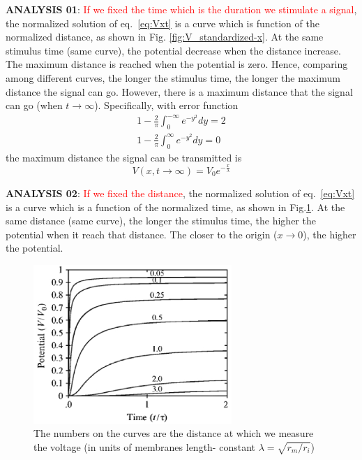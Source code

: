 {\bf ANALYSIS 01}: \textcolor{red}{If we fixed the time which is the duration we
stimulate a signal}, the normalized solution of eq.~\eqref{eq:Vxt} is a curve
which is function of the normalized distance, as shown in
Fig. \ref{fig:V_standardized-x}. At the same stimulus time (same
curve), the potential decrease when the distance increase. The maximum
distance is reached when the potential is zero. Hence, comparing among
different curves, the longer the stimulus time, the longer the maximum
distance the signal can go. However, there is a maximum distance that
the signal can go (when $t\rightarrow \infty$).  Specifically, with
error function
\begin{equation}\begin{split}
  1 -
  \frac{2}{\pi}
  \int_0^{-\infty} e^{-y^2} dy = 2 \\
  1 -
  \frac{2}{\pi}
  \int_0^{\infty} e^{-y^2} dy = 0
\end{split}
\end{equation}
the maximum distance the signal can be transmitted is 
\begin{equation}
  V(x,t\rightarrow \infty) = V_0 e^{-\frac{x}{\lambda}}
\end{equation}

{\bf ANALYSIS 02}: \textcolor{red}{If we fixed the distance}, the normalized
solution of eq.~\eqref{eq:Vxt} is a curve which is a function of the normalized
time, as shown in Fig.\ref{fig:V_standardized-t}. At the same distance
(same curve), the longer the stimulus time, the higher the potential
when it reach that distance. The closer to the origin ($x\rightarrow
0$), the higher the potential.
\begin{figure}[htb]
\centerline{\includegraphics[height=6cm]{./images/V_standardized-t.eps}}
\caption{The numbers on the curves are the distance at which we
  measure the voltage (in units of membranes length-
  constant $\lambda = \sqrt{r_m/r_i}$)}\label{fig:V_standardized-t}
\end{figure}  



